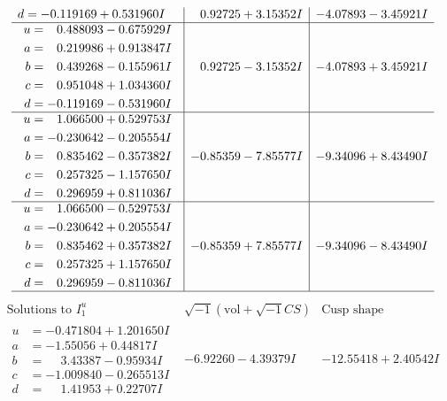 \documentclass[1p]{elsarticle_modified}
\theoremstyle{definition}
\newcommand{\I}{\sqrt{-1}}
\begin{document}
$$\begin{array}{c|c|c}
\begin{aligned}
d &= -0.119169 + 0.531960 I\end{aligned}
 & \phantom{-}0.92725 + 3.15352 I & -4.07893 - 3.45921 I \\ \hline\begin{aligned}
u &= \phantom{-}0.488093 - 0.675929 I \\
a &= \phantom{-}0.219986 + 0.913847 I \\
b &= \phantom{-}0.439268 - 0.155961 I \\
c &= \phantom{-}0.951048 + 1.034360 I \\
d &= -0.119169 - 0.531960 I\end{aligned}
 & \phantom{-}0.92725 - 3.15352 I & -4.07893 + 3.45921 I \\ \hline\begin{aligned}
u &= \phantom{-}1.066500 + 0.529753 I \\
a &= -0.230642 - 0.205554 I \\
b &= \phantom{-}0.835462 - 0.357382 I \\
c &= \phantom{-}0.257325 - 1.157650 I \\
d &= \phantom{-}0.296959 + 0.811036 I\end{aligned}
 & -0.85359 - 7.85577 I & -9.34096 + 8.43490 I \\ \hline\begin{aligned}
u &= \phantom{-}1.066500 - 0.529753 I \\
a &= -0.230642 + 0.205554 I \\
b &= \phantom{-}0.835462 + 0.357382 I \\
c &= \phantom{-}0.257325 + 1.157650 I \\
d &= \phantom{-}0.296959 - 0.811036 I\end{aligned}
 & -0.85359 + 7.85577 I & -9.34096 - 8.43490 I\\
 \hline 
 \end{array}$$\newpage$$\begin{array}{c|c|c}  
\text{Solutions to }I^u_{1}& \I (\text{vol} + \sqrt{-1}CS) & \text{Cusp shape}\\
 \hline 
\begin{aligned}
u &= -0.471804 + 1.201650 I \\
a &= -1.55056 + 0.44817 I \\
b &= \phantom{-}3.43387 - 0.95934 I \\
c &= -1.009840 - 0.265513 I \\
d &= \phantom{-}1.41953 + 0.22707 I\end{aligned}
 & -6.92260 - 4.39379 I & -12.55418 + 2.40542 I \\ \hline\begin{aligned}

\end{aligned}
\end{array}$$
\end{document}
